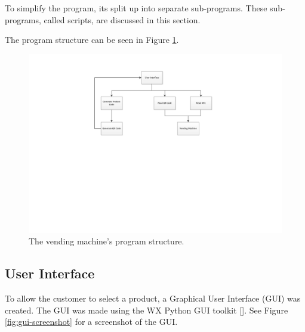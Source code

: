 To simplify the program, its split up into separate sub-programs. These
sub-programs, called scripts, are discussed in this section.

The program structure can be seen in Figure
\ref{fig:vm_prog_strcture}.

\begin{figure}
 \centering 
 \includegraphics[clip=true, trim = 100 320 0 50,
 scale=0.7]{vending_machine_program_structure}
 \caption{The vending machine's program structure.}
 \label{fig:vm_prog_strcture}
\end{figure}

\subsection{User Interface}

To allow the customer to select a product, a Graphical User Interface (GUI) was
created. The GUI was made using the WX Python GUI toolkit
[\cite{website:wx-python}].
See Figure \ref{fig:gui-screenshot} for a screenshot of the
GUI.

